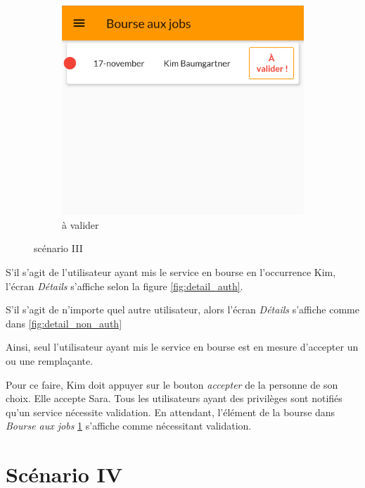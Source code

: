 \begin{figure}[!h]
\begin{subfigure}{.3\textwidth}
        \end{subfigure}
        \begin{subfigure}{.3\textwidth}
            \centering
            \includegraphics[width=0.9\linewidth]{screenshots/scenario_03/a_valider.png}
            \caption{à valider}
            \label{fig:a_valider}
        \end{subfigure}
        \caption{scénario III}
        \label{fig:scen03}
    \end{figure}

    S'il s'agit de l'utilisateur ayant mis le service en bourse en l'occurrence Kim, l'écran \textit{Détails} s'affiche selon la figure \ref{fig:detail_auth}.
    
    S'il s'agit de n'importe quel autre utilisateur, alors l'écran \textit{Détails} s'affiche comme dans \ref{fig:detail_non_auth}

    Ainsi, seul l'utilisateur ayant mis le service en bourse est en mesure d'accepter un ou une remplaçante. 
    
    Pour ce faire, Kim doit appuyer sur le bouton \textit{accepter} de la personne de son choix.
    Elle accepte Sara. Tous les utilisateurs ayant des privilèges sont notifiés qu'un service nécessite validation.
    En attendant, l'élément de la bourse dans \textit{Bourse aux jobs} \ref{fig:a_valider} s'affiche comme nécessitant validation.

\section[Valider un échange - Scénario IV]{Scénario IV}
